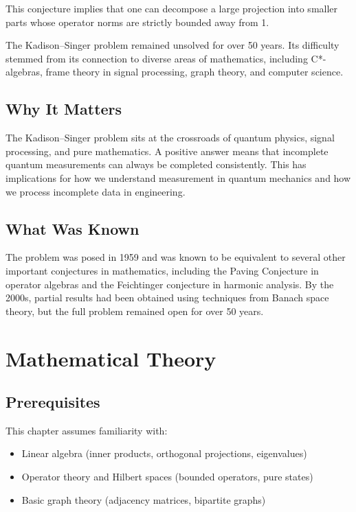 This conjecture implies that one can decompose a large projection into smaller parts whose operator norms are strictly bounded away from 1.

\begin{historicalbox}
The Kadison--Singer problem remained unsolved for over 50 years. Its difficulty stemmed from its connection to diverse areas of mathematics, including C*-algebras, frame theory in signal processing, graph theory, and computer science.
\end{historicalbox}

\subsection{Why It Matters}
The Kadison--Singer problem sits at the crossroads of quantum physics, signal processing, and pure mathematics. A positive answer means that incomplete quantum measurements can always be completed consistently. This has implications for how we understand measurement in quantum mechanics and how we process incomplete data in engineering.

\subsection{What Was Known}
The problem was posed in 1959 and was known to be equivalent to several other important conjectures in mathematics, including the Paving Conjecture in operator algebras and the Feichtinger conjecture in harmonic analysis. By the 2000s, partial results had been obtained using techniques from Banach space theory, but the full problem remained open for over 50 years.

\section{Mathematical Theory}


\subsection{Prerequisites}
This chapter assumes familiarity with:
\begin{itemize}
\item Linear algebra (inner products, orthogonal projections, eigenvalues)
\item Operator theory and Hilbert spaces (bounded operators, pure states)
\item Basic graph theory (adjacency matrices, bipartite graphs)
\end{itemize}

